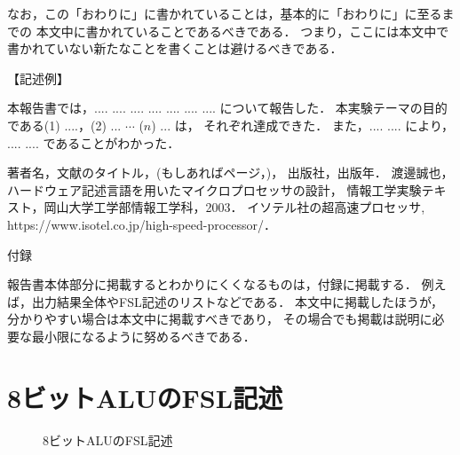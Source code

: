 \documentclass{ujarticle}[11pt]
\begin{document}
    なお，この「おわりに」に書かれていることは，基本的に「おわりに」に至るまでの
    本文中に書かれていることであるべきである．
    つまり，ここには本文中で書かれていない新たなことを書くことは避けるべきである．
     
    \noindent
    【記述例】
     
    本報告書では，.... .... .... .... .... .... .... について報告した．
    本実験テーマの目的である(1) ....，(2) ... $\cdots$ ($n$) ... は，
    それぞれ達成できた．
    また，.... .... により， .... .... であることがわかった．
     
    \begin{thebibliography}{9}
     著者名，文献のタイトル，(もしあればページ，)，
    出版社，出版年．
    渡邊誠也，ハードウェア記述言語を用いたマイクロプロセッサの設計，
    情報工学実験テキスト，岡山大学工学部情報工学科，2003．
    イソテル社の超高速プロセッサ, https://www.isotel.co.jp/high-speed-processor/．
    \end{thebibliography}
     
     
    \newpage
    \appendix
     
    \noindent
    {\Large \gt 付録}
     
    報告書本体部分に掲載するとわかりにくくなるものは，付録に掲載する．
    例えば，出力結果全体やFSL記述のリストなどである．
    本文中に掲載したほうが，分かりやすい場合は本文中に掲載すべきであり，
    その場合でも掲載は説明に必要な最小限になるように努めるべきである．
     
    \section{8ビットALUのFSL記述}
    \label{appsec:8ビットALUのFSL記述}
     
    \begin{figure}[hbtp]
    \begin{center}
    \caption{8ビットALUのFSL記述}
    \label{fig:8ビットALUのFSL記述}
    \end{center}
    \end{figure}
     
\end{document}
